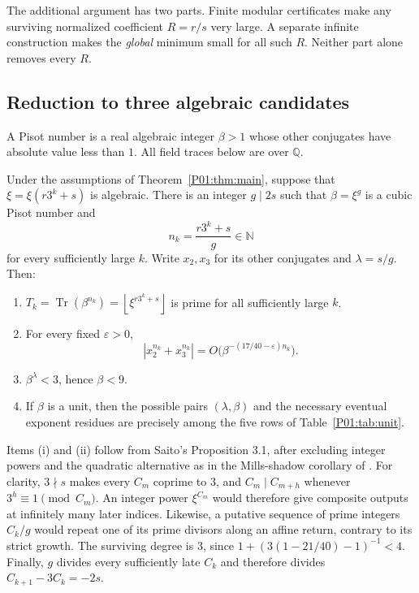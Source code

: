 \documentclass[11pt,a4paper]{article}
\theoremstyle{definition}\newtheorem{definition}[theorem]{Definition}
\theoremstyle{remark}\newtheorem{remark}[theorem]{Remark}
\newcommand{\N}{\mathbb N}\newcommand{\Z}{\mathbb Z}\newcommand{\Q}{\mathbb Q}
\newcommand{\floor}[1]{\left\lfloor#1\right\rfloor}
\DeclareMathOperator{\Tr}{Tr}\DeclareMathOperator{\tr}{tr}\DeclareMathOperator{\Nm}{N}
\begin{document}
The additional argument has two parts. Finite modular certificates make
any surviving normalized coefficient $R=r/s$ very large. A separate
infinite construction makes the \emph{global} minimum small for all such
$R$. Neither part alone removes every $R$.

\subsection{Reduction to three algebraic candidates}\label{P01:sec:reduction}

A Pisot number is a real algebraic integer $\beta>1$ whose other
conjugates have absolute value less than $1$.
All field traces below are over $\Q$.

\begin{proposition}
\label{P01:prop:inputs}
Under the assumptions of Theorem~\ref{P01:thm:main}, suppose that
$\xi=\xi(r3^k+s)$ is algebraic. There is an integer $g\mid2s$ such that
$\beta=\xi^g$ is a cubic Pisot number and
\[
 n_k=\frac{r3^k+s}{g}\in\N
\]
for every sufficiently large $k$. Write $x_2,x_3$ for its other
conjugates and $\lambda=s/g$. Then:
\begin{enumerate}[label=\textup{(\roman*)}]
\item $T_k=\Tr(\beta^{n_k})=\floor{\xi^{r3^k+s}}$ is prime for all
sufficiently large $k$.
\item For every fixed $\varepsilon>0$,
\[
 |x_2^{n_k}+x_3^{n_k}|
     =O\bigl(\beta^{-(17/40-\varepsilon)n_k}\bigr).
\]
\item $\beta^{\lambda}<3$, hence $\beta<9$.
\item If $\beta$ is a unit, then the possible pairs $(\lambda,\beta)$
and the necessary eventual exponent residues are precisely among the
five rows of Table~\ref{P01:tab:unit}.
\end{enumerate}
\end{proposition}

Items (i) and (ii) follow from Saito's Proposition 3.1, after excluding
integer powers and the quadratic alternative as in the Mills-shadow
corollary of \cite{K064}. For clarity, $3\nmid s$ makes every $C_m$
coprime to $3$, and $C_m\mid C_{m+h}$ whenever
$3^h\equiv1\pmod{C_m}$. An integer power $\xi^{C_m}$ would therefore
give composite outputs at infinitely many later indices. Likewise, a
putative sequence of prime integers $C_k/g$ would repeat one of its
prime divisors along an affine return, contrary to its strict growth.
The surviving degree is $3$, since
$1+(3(1-21/40)-1)^{-1}<4$.
Finally, $g$ divides every sufficiently late $C_k$ and therefore divides
$C_{k+1}-3C_k=-2s$.
\end{document}
